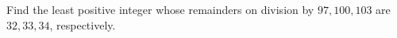 Find the least positive integer whose remainders on division by $97,100,103$ are $32,33,34$, respectively.
